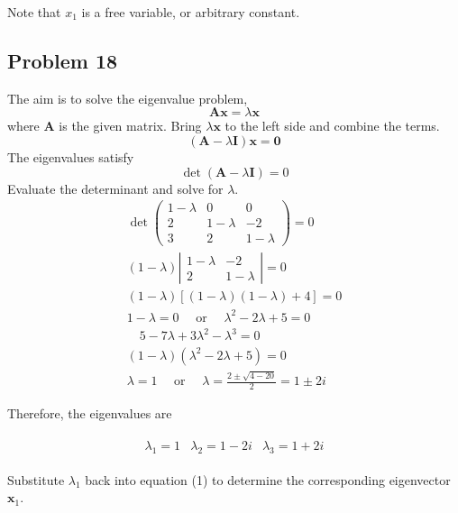\documentclass[12pt]{article}
\begin{document}
Note that \(x_{1}\) is a free variable, or arbitrary constant.
\subsection*{Problem 18}
\label{sec:org6bc6daf}
   The aim is to solve the eigenvalue problem,
$$
\mathbf{A} \mathbf{x}=\lambda \mathbf{x}
$$
where \(\mathbf{A}\) is the given matrix. Bring \(\lambda \mathbf{x}\) to the left side and combine the terms.
$$
(\mathbf{A}-\lambda \mathbf{I}) \mathbf{x}=\mathbf{0}
$$
The eigenvalues satisfy
$$
\operatorname{det}(\mathbf{A}-\lambda \mathbf{I})=0
$$
Evaluate the determinant and solve for \(\lambda\).
\begin{equation*}
	\begin{array}{c}
		\operatorname{det}\left(\begin{array}{ccc}
				1-\lambda & 0         & 0         \\
				2         & 1-\lambda & -2        \\
				3         & 2         & 1-\lambda
			\end{array}\right)=0     \\
		(1-\lambda)\left|\begin{array}{cc}
			1-\lambda & -2        \\
			2         & 1-\lambda
		\end{array}\right|=0            \\
		(1-\lambda)[(1-\lambda)(1-\lambda)+4]=0                        \\
		1-\lambda=0 \quad \text { or } \quad \lambda^{2}-2 \lambda+5=0 \\
		\quad 5-7 \lambda+3 \lambda^{2}-\lambda^{3}=0                  \\
		(1-\lambda)\left(\lambda^{2}-2 \lambda+5\right)=0              \\
		\lambda=1 \quad \text { or } \quad \lambda=\frac{2 \pm \sqrt{4-20}}{2}=1 \pm 2 i
	\end{array}
\end{equation*}

Therefore, the eigenvalues are

\begin{align*}
\begin{array}{|l|l|l|l|}
\hline \lambda_{1}=1 & \lambda_{2}=1-2 i & \lambda_{3}=1+2 i
\end{array}
\end{align*}

Substitute \(\lambda_{1}\) back into equation (1) to determine the corresponding
eigenvector \(\mathbf{x}_{1}\). 
\end{document}
